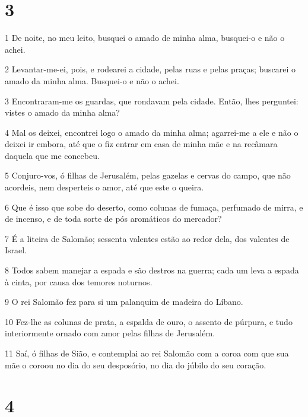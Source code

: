 \chapter{3}

\par 1 De noite, no meu leito, busquei o amado de minha alma, busquei-o e não o achei.
\par 2 Levantar-me-ei, pois, e rodearei a cidade, pelas ruas e pelas praças; buscarei o amado da minha alma. Busquei-o e não o achei.
\par 3 Encontraram-me os guardas, que rondavam pela cidade. Então, lhes perguntei: vistes o amado da minha alma?
\par 4 Mal os deixei, encontrei logo o amado da minha alma; agarrei-me a ele e não o deixei ir embora, até que o fiz entrar em casa de minha mãe e na recâmara daquela que me concebeu.
\par 5 Conjuro-vos, ó filhas de Jerusalém, pelas gazelas e cervas do campo, que não acordeis, nem desperteis o amor, até que este o queira.
\par 6 Que é isso que sobe do deserto, como colunas de fumaça, perfumado de mirra, e de incenso, e de toda sorte de pós aromáticos do mercador?
\par 7 É a liteira de Salomão; sessenta valentes estão ao redor dela, dos valentes de Israel.
\par 8 Todos sabem manejar a espada e são destros na guerra; cada um leva a espada à cinta, por causa dos temores noturnos.
\par 9 O rei Salomão fez para si um palanquim de madeira do Líbano.
\par 10 Fez-lhe as colunas de prata, a espalda de ouro, o assento de púrpura, e tudo interiormente ornado com amor pelas filhas de Jerusalém.
\par 11 Saí, ó filhas de Sião, e contemplai ao rei Salomão com a coroa com que sua mãe o coroou no dia do seu desposório, no dia do júbilo do seu coração.

\chapter{4}

